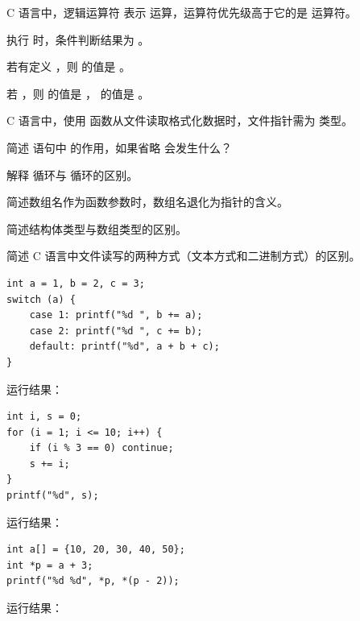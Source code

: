 \documentclass[a4paper,11pt]{article}
\begin{document}
\examtitle


\anslines{0.1cm}

\q C 语言中，逻辑运算符 \code{\&\&} 表示 \fillblank 运算，运算符优先级高于它的是 \fillblank 运算符。

\q 执行  时，条件判断结果为 \fillblank 。

\q 若有定义 ，则  的值是 \fillblank 。

\q 若 ，则  的值是 \fillblank ， 的值是 \fillblank 。

\q C 语言中，使用  函数从文件读取格式化数据时，文件指针需为 \fillblank 类型。


\q 简述  语句中  的作用，如果省略  会发生什么？
\anslines{1.5cm}

\q 解释  循环与  循环的区别。
\anslines{1.5cm}

\q 简述数组名作为函数参数时，数组名退化为指针的含义。
\anslines{1.5cm}

\q 简述结构体类型与数组类型的区别。
\anslines{1.5cm}

\q 简述 C 语言中文件读写的两种方式（文本方式和二进制方式）的区别。
\anslines{1.5cm}


\q
\begin{lstlisting}[language={[custom]C}]
int a = 1, b = 2, c = 3;
switch (a) {
    case 1: printf("%d ", b += a);
    case 2: printf("%d ", c += b);
    default: printf("%d", a + b + c);
}
\end{lstlisting}
运行结果：\underline{\hspace{3cm}}


\q
\begin{lstlisting}[language={[custom]C}]
int i, s = 0;
for (i = 1; i <= 10; i++) {
    if (i % 3 == 0) continue;
    s += i;
}
printf("%d", s);
\end{lstlisting}
运行结果：\underline{\hspace{3cm}}


\q
\begin{lstlisting}[language={[custom]C}]
int a[] = {10, 20, 30, 40, 50};
int *p = a + 3;
printf("%d %d", *p, *(p - 2));
\end{lstlisting}
运行结果：\underline{\hspace{3cm}}
\end{document}
